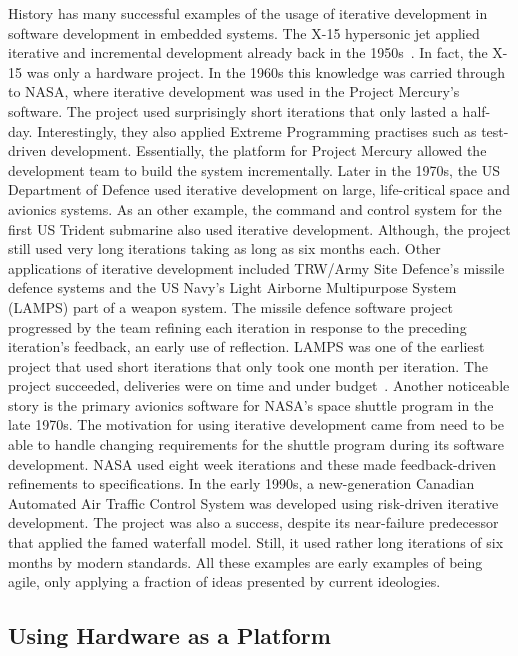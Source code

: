 \documentclass[english]{tktltiki2}
\begin{document}
History has many successful examples of the usage of iterative development in software development in embedded systems. The X-15 hypersonic jet applied iterative and incremental development already back in the 1950s~\cite{LB03}. In fact, the X-15 was only a hardware project. In the 1960s this knowledge was carried through to NASA, where iterative development was used in the Project Mercury’s software. The project used surprisingly short iterations that only lasted a half-day. Interestingly, they also applied Extreme Programming practises such as test-driven development. Essentially, the platform for Project Mercury allowed the development team to build the system incrementally. Later in the 1970s, the US Department of Defence used iterative development on large, life-critical space and avionics systems. As an other example, the command and control system for the first US Trident submarine also used iterative development. Although, the project still used very long iterations taking as long as six months each. Other applications of iterative development included TRW/Army Site Defence’s missile defence systems and the US Navy’s Light Airborne Multipurpose System (LAMPS) part of a weapon system. The missile defence software project progressed by the team refining each iteration in response to the preceding iteration’s feedback, an early use of reflection. LAMPS was one of the earliest project that used short iterations that only took one month per iteration. The project succeeded, deliveries were on time and under budget~\cite{LB03}. Another noticeable story is the primary avionics software for NASA’s space shuttle program in the late 1970s. The motivation for using iterative development came from need to be able to handle changing requirements for the shuttle program during its software development. NASA used eight week iterations and these made feedback-driven refinements to specifications. In the early 1990s, a new-generation Canadian Automated Air Traffic Control System was developed using risk-driven iterative development. The project was also a success, despite its near-failure predecessor that applied the famed waterfall model. Still, it used rather long iterations of six months by modern standards. All these examples are early examples of being agile, only applying a fraction of ideas presented by current ideologies.

\subsection{Using Hardware as a Platform}
\end{document}
